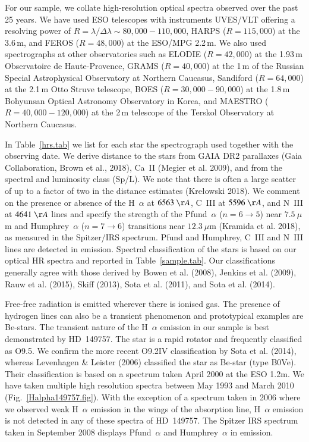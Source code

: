 \documentclass[tradiabstract]{aa} %
\begin{document}
For our sample, we collate high-resolution optical spectra observed
over the past 25 years. We have used ESO telescopes with instruments
UVES/VLT offering a resolving power of $R =\lambda / \Delta \lambda
\sim 80,000-110,000$, HARPS ($R = 115,000$) at the 3.6\,m, and FEROS
($R = 48,000$) at the ESO/MPG 2.2\,m. We also used spectrographs at
other observatories such as ELODIE ($R = 42,000$) at the 1.93\,m
Observatoire de Haute-Provence, GRAMS ($R = 40,000$) at the 1\,m of
the Russian Special Astrophysical Observatory at Northern Caucasus,
Sandiford ($R = 64,000$) at the 2.1\,m Otto Struve telescope, BOES ($R
= 30,000 - 90,000$) at the 1.8\,m Bohyunsan Optical Astronomy
Observatory in Korea, and MAESTRO ($R = 40,000-120,000$) at the 2\,m telescope of
the Terskol Observatory at Northern Caucasus.

In Table~\ref{hrs.tab} we list for each star the spectrograph used
together with the observing date. We derive distance to the stars from
GAIA DR2 parallaxes (Gaia Collaboration, Brown et al., 2018), Ca~II
(Megier et al. 2009), and from the spectral and luminosity class
(Sp/L). We note that there is often a large scatter of up to a factor of
two in the distance estimates (Kre{\l}owski 2018). We comment on the
presence or absence of the H~$\alpha$ at ${6563 \ \AA}$, C~III at
${5596 \ \AA}$, and N~III at ${4641\ \AA}$ lines and specify the
strength of the Pfund~$\alpha$ ($n=6 \rightarrow 5$) near $7.5\ \mu$m
and Humphrey~$\alpha$ ($n=7 \rightarrow 6$) transitions near $12.3
\ \mu$m (Kramida et al. 2018), as measured in the Spitzer/IRS
spectrum.  { Pfund and Humphrey, C~III and N~III lines are detected
  in emission.}  Spectral classification of the stars is based on{
  our optical HR spectra} and reported in Table~\ref{sample.tab}. Our
classifications generally agree with those derived by Bowen et
al. (2008), Jenkins et al. (2009), Rauw et al. (2015), Skiff (2013),
Sota et al. (2011), and Sota et al. (2014).

Free-free radiation is emitted wherever there is ionised gas. The {
  presence} of hydrogen lines can also be a transient phenomenon and
prototypical examples are Be-stars. The transient nature of the
H~$\alpha$ emission in our sample is best demonstrated by HD~149757.
The star is a rapid rotator and frequently classified as O9.5. We
confirm the more recent O9.2IV classification by Sota et al. (2014),
whereas Levenhagen \& Leister (2006) classified the star as Be-star
(type B0Ve).  Their classification is based on a spectrum taken April
2000 at the ESO 1.2m.  We have taken multiple high resolution spectra
between May 1993 and March 2010 (Fig.~\ref{Halpha149757.fig}). With
the exception of a spectrum taken in 2006 where we observed weak
H~$\alpha$ emission in the wings of the absorption line, H~$\alpha$
emission is not detected in any of these spectra of HD~149757. The
Spitzer IRS spectrum taken in September 2008 displays Pfund~$\alpha$
and Humphrey~$\alpha$ in emission.
\end{document}
